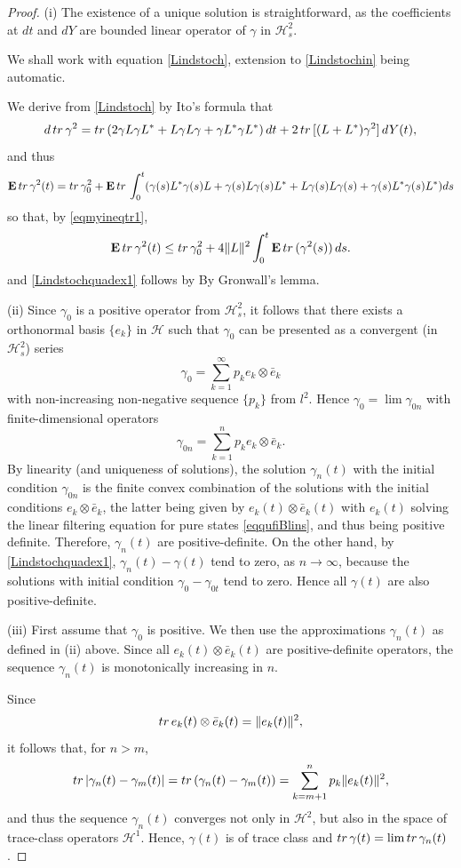 \documentclass[10pt,a4paper]{amsart}
\def\HC{\mathcal{H}}
\def\E{\mathbf{E}}
\def\tr{\rm{tr}}
\def\ga{\gamma}
\begin{document}
\begin{proof}
(i) The existence of a unique solution is straightforward, as the coefficients at $dt$ and $dY$ are
bounded linear operator of $\ga$ in $\HC^2_s$.

We shall work with equation \eqref{Lindstoch}, extension to  \eqref{Lindstochin} being automatic.

We derive from
\eqref{Lindstoch} by Ito's formula that
\begin{equation}
\label{Lindstochquadtr}
d \, {\tr}\, \ga^2={\tr} \,(2\ga L\ga L^*+ L \ga L \ga + \ga L^* \ga L^*) \, dt
+2\, {\tr} \, [(L+L^*)\ga^2] \, dY(t),
\end{equation}
and thus
\[
\E \, {\tr}\, \ga^2(t)
={\tr}\, \ga_0^2 +\E \, {\tr} \,
\int_0^t (\ga(s) L^*\ga(s) L+\ga(s) L\ga(s) L^*+ L \ga(s) L \ga(s) + \ga(s) L^* \ga(s) L^*) ds
\]
so that, by \eqref{eqmyineqtr1},
\[
\E \, {\tr}\, \ga^2(t) \le {\tr}\, \ga_0^2+ 4 \|L\|^2 \int_0^t  \E \, {\tr} \,(\ga^2(s)) \, ds.
\]
and \eqref{Lindstochquadex1} follows by By Gronwall's lemma.

 (ii) Since $\ga_0$ is a positive operator from $\HC^2_s$, it follows that
  there exists a orthonormal basis $\{e_k\}$ in $\HC$ such that $\ga_0$
 can be presented as a convergent (in $\HC^2_s$) series
 \[
 \ga_0=\sum_{k=1}^{\infty} p_k e_k\otimes \bar e_k
 \]
 with non-increasing non-negative sequence $\{p_k\}$ from $l^2$. Hence $\ga_0=\lim \ga_{0n}$
 with finite-dimensional operators
 \[
 \ga_{0n}=\sum_{k=1}^n p_k e_k\otimes \bar e_k.
 \]
By linearity (and uniqueness of solutions), the solution $\ga_n(t)$ with the initial condition $\ga_{0n}$ is the finite
convex combination of the solutions with the initial conditions $e_k\otimes \bar e_k$, the latter
being given by $e_k(t)\otimes \bar e_k(t)$ with $e_k(t)$ solving the linear filtering equation for
pure states \eqref{eqqufiBlins}, and thus being positive definite. Therefore, $\ga_n(t)$ are positive-definite.
On the other hand, by \eqref{Lindstochquadex1}, $\ga_n(t)-\ga(t)$ tend to zero, as $n\to \infty$,
because the solutions with initial condition $\ga_0-\ga_{0t}$ tend to zero. Hence all $\ga (t)$ are
also positive-definite.

(iii) First assume that $\ga_0$ is positive. We then use the approximations
$\ga_n(t)$ as defined in (ii) above.
Since all $e_k(t)\otimes \bar e_k(t)$ are positive-definite operators,
the sequence $\ga_n(t)$ is monotonically increasing in $n$.

Since
\begin{equation}
\label{tracenormsq}
{\tr} \, e_k(t)\otimes \bar e_k(t)=\|e_k(t)\|^2,
\end{equation}
it follows that, for $n>m$,
\[
{\tr}\, |\ga_n(t)-\ga_m(t)|={\tr}\, (\ga_n(t)-\ga_m(t))
=\sum_{k=m+1}^n p_k \|e_k(t)\|^2,
\]
and thus the sequence $\ga_n(t)$ converges not only in $\HC^2$, but also in
the space of trace-class operators $\HC^1$. Hence, $\ga(t)$ is of trace class and
${\tr }\, \ga(t)=\lim {\tr}\, \ga_n(t)$.


\end{proof}
\end{document}
